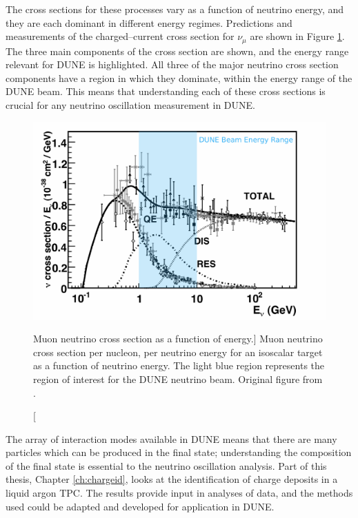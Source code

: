 \medskip\noindent
The cross sections for these processes vary as a function of neutrino energy,
and they are each dominant in different energy regimes. Predictions and 
measurements of the charged--current cross section for $\nu_\mu$ are shown in 
Figure \ref{fig:numu_xsec}. The three main components of the cross section are 
shown, and the energy range relevant for DUNE is 
highlighted\cite{Formaggio:2013kya}.  All three of the major neutrino cross 
section components have a region in which they dominate, within the energy 
range of the DUNE beam. This means that understanding each of these cross 
sections is crucial for any neutrino oscillation measurement in DUNE. 

\begin{figure}
	\centering
	\includegraphics[width=\textwidth]{figures/numu_xsec.pdf}
	\caption
	[Muon neutrino cross section as a function of energy.]
	{Muon neutrino cross section per nucleon, per neutrino energy for an isoscalar
	target as a function of neutrino energy. The light blue region represents the 
	region of interest for the DUNE neutrino beam. Original figure from 
	\cite{Formaggio:2013kya}.}
	\label{fig:numu_xsec}
\end{figure}

The array of interaction modes available in DUNE means that there are many
particles which can be produced in the final state; understanding 
the composition of the final state is essential to the neutrino oscillation 
analysis. Part of this thesis, Chapter \ref{ch:chargeid}, looks at
the identification of charge deposits in a liquid argon TPC. The results 
provide input in analyses of \protodune{} data, and the methods used could 
be adapted and developed for application in DUNE. 

